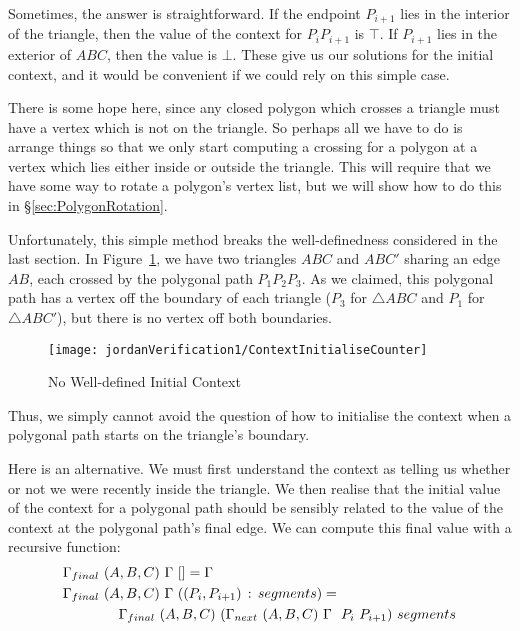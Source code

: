 Sometimes, the answer is straightforward. If the endpoint $P_{i+1}$ lies in the interior of the triangle, then the value of the context for $P_iP_{i+1}$ is $\top$. If $P_{i+1}$ lies in the exterior of $ABC$, then the value is $\bot$. These give us our solutions for the initial context, and it would be convenient if we could rely on this simple case.

There is some hope here, since any closed polygon which crosses a triangle must have a vertex which is not on the triangle. So perhaps all we have to do is arrange things so that we only start computing a crossing for a polygon at a vertex which lies either inside or outside the triangle. This will require that we have some way to rotate a polygon's vertex list, but we will show how to do this in \S\ref{sec:PolygonRotation}.

Unfortunately, this simple method breaks the well-definedness considered in the last section. In Figure~\ref{fig:ContextInitialiseCounter}, we have two triangles $ABC$ and $ABC'$ sharing an edge $AB$, each crossed by the polygonal path $P_1P_2P_3$. As we claimed, this polygonal path has a vertex off the boundary of each triangle ($P_3$ for $\triangle ABC$ and $P_1$ for $\triangle ABC'$), but there is no vertex off both boundaries. 

\begin{figure}
\centering\texttt{[image: jordanVerification1/ContextInitialiseCounter]}
\caption{No Well-defined Initial Context}\label{fig:ContextInitialiseCounter}
\end{figure}

Thus, we simply cannot avoid the question of how to initialise the context when a polygonal path starts on the triangle's boundary. 

Here is an alternative. We must first understand the context as telling us whether or not we were recently inside the triangle. We then realise that the initial value of the context for a polygonal path should be sensibly related to the value of the context at the polygonal path's final edge. We can compute this final value with a recursive function:
\begin{equation}
\begin{aligned}
&\Gamma_{final}\ (A,B,C)\ \Gamma\ [] = \Gamma\\
&\Gamma_{final}\ (A,B,C)\ \Gamma\ ((P_i,P_{i+1})\,:\,segments) = \\
&\qquad\qquad\Gamma_{final}\ (A,B,C)\ (\Gamma_{next}\ (A,B,C)\ \Gamma\ \ P_i\ P_{i+1})\ segments
\end{aligned}
\end{equation}

